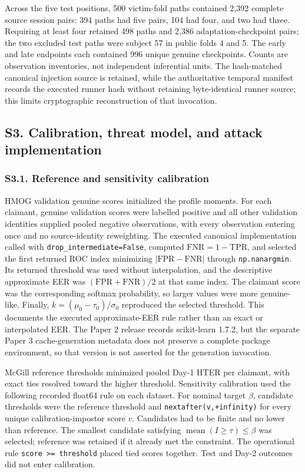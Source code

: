 \documentclass[technologies,supfile,submit,moreauthors]{Definitions/mdpi}
\begin{document}
Across the five test positions, 500 victim-fold paths contained 2,392 complete source session pairs: 394 paths had five pairs, 104 had four, and two had three. Requiring at least four retained 498 paths and 2,386 adaptation-checkpoint pairs; the two excluded test paths were subject 57 in public folds 4 and 5. The early and late endpoints each contained 996 unique genuine checkpoints. Counts are observation inventories, not independent inferential units. The hash-matched canonical injection source is retained, while the authoritative temporal manifest records the executed runner hash without retaining byte-identical runner source; this limits cryptographic reconstruction of that invocation.

\subsection*{S3. Calibration, threat model, and attack implementation}\label{sm:s3}

\subsubsection*{S3.1. Reference and sensitivity calibration}\label{sm:s3-1}

HMOG validation genuine scores initialized the profile moments. For each claimant, genuine validation scores were labelled positive and all other validation identities supplied pooled negative observations, with every observation entering once and no source-identity reweighting. The executed canonical implementation called \texttt{} with \texttt{drop\_intermediate=False}, computed \(\mathrm{FNR}=1-\mathrm{TPR}\), and selected the first returned ROC index minimizing \(|\mathrm{FPR}-\mathrm{FNR}|\) through \texttt{np.nanargmin}. Its returned threshold was used without interpolation, and the descriptive approximate EER was \((\mathrm{FPR}+\mathrm{FNR})/2\) at that same index. The claimant score was the corresponding softmax probability, so larger values were more genuine-like. Finally, \(k=(\mu_0-\tau_0)/\sigma_0\) reproduced the selected threshold. This documents the executed approximate-EER rule rather than an exact or interpolated EER. The Paper 2 release records scikit-learn 1.7.2, but the separate Paper 3 cache-generation metadata does not preserve a complete package environment, so that version is not asserted for the generation invocation.

McGill reference thresholds minimized pooled Day-1 HTER per claimant, with exact ties resolved toward the higher threshold. Sensitivity calibration used the following recorded float64 rule on each dataset. For nominal target \(\beta\), candidate thresholds were the reference threshold and \texttt{nextafter(v,+infinity)} for every unique calibration-impostor score \(v\). Candidates had to be finite and no lower than reference. The smallest candidate satisfying \(\operatorname{mean}(I\geq\tau)\leq\beta\) was selected; reference was retained if it already met the constraint. The operational rule \texttt{score\ \textgreater{}=\ threshold} placed tied scores together. Test and Day-2 outcomes did not enter calibration.
\end{document}
